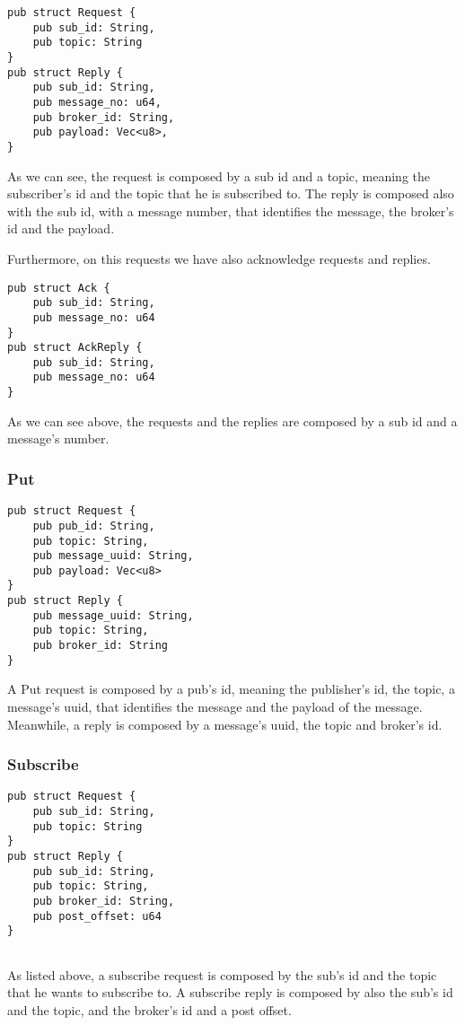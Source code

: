 \begin{lstlisting}
pub struct Request {
    pub sub_id: String,
    pub topic: String
}
pub struct Reply {
    pub sub_id: String,
    pub message_no: u64,
    pub broker_id: String,
    pub payload: Vec<u8>,
}
\end{lstlisting}
As we can see, the request is composed by a sub id and a topic, meaning the subscriber's id and the topic that he is subscribed to.
The reply is composed also with the sub id, with a message number, that identifies the message, the broker's id and the payload.\par
Furthermore, on this requests we have also acknowledge requests and replies.
\begin{lstlisting}
pub struct Ack {
    pub sub_id: String,
    pub message_no: u64
}
pub struct AckReply {
    pub sub_id: String,
    pub message_no: u64
}
\end{lstlisting}
As we can see above, the requests and the replies are composed by a sub id and a message's number.
\subsubsection{Put}

\begin{lstlisting}
pub struct Request {
    pub pub_id: String,
    pub topic: String,
    pub message_uuid: String,
    pub payload: Vec<u8>
}
pub struct Reply {
    pub message_uuid: String,
    pub topic: String,
    pub broker_id: String
}
\end{lstlisting}
A Put request is composed by a pub's id, meaning the publisher's id, the topic, a message's uuid, that identifies the message and the payload of the message. Meanwhile, a reply is composed by a message's uuid, the topic and broker's id.
\subsubsection{Subscribe}

\begin{lstlisting}
pub struct Request {
    pub sub_id: String,
    pub topic: String
}
pub struct Reply {
    pub sub_id: String,
    pub topic: String,
    pub broker_id: String,
    pub post_offset: u64
}
    
\end{lstlisting}
As listed above, a subscribe request is composed by the sub's id and the topic that he wants to subscribe to. A subscribe reply is composed by also the sub's id and the topic, and the broker's id and a post offset.
